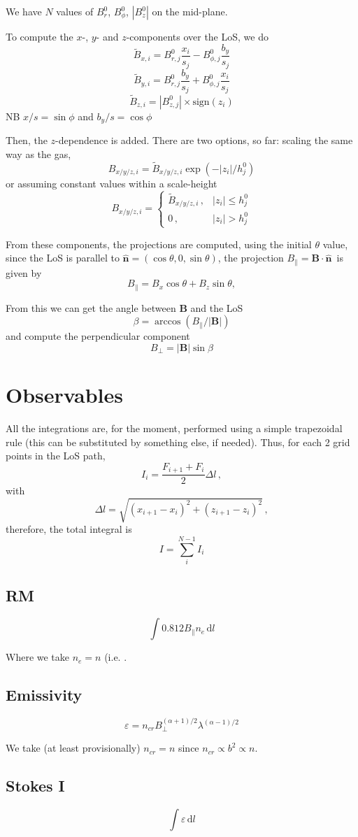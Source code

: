 \documentclass[a4paper,10pt]{article}
\newcommand{\dd}{\mathrm{d}}  %
\renewcommand{\vec}{\bm} %
\begin{document}
We have $N$ values of $B^0_r$, $B^0_\phi$, $|B^0_z|$
on the mid-plane.

To compute the $x$-, $y$- and $z$-components over the LoS, we do
\[
\widetilde B_{x,i} = B^0_{r,j} \frac{x_i}{s_j} - B^0_{\phi,j} \frac{b_y}{s_j}
\]
\[
\widetilde B_{y,i} = B^0_{r,j} \frac{b_y}{s_j} + B^0_{\phi,j} \frac{x_i}{s_j}
\]
\[
\widetilde B_{z,i} = |B^0_{z,j}| \times \text{sign}(z_i)
\]
NB $x/s = \sin\phi$ and $b_y/s = \cos\phi$

Then, the $z$-dependence is added. There are two options, so far: scaling the same way
as the gas,
\[
    B_{x/y/z,i} = \widetilde B_{x/y/z,i} \exp(-|z_i|/h^0_j)
\]
or assuming constant values within a scale-height
\[
    B_{x/y/z,i} = \begin{cases}
                    \widetilde B_{x/y/z,i}\,, & |z_i| \leq h^0_j\\
                                0\,,          & |z_i| >    h^0_j
                  \end{cases}
\]

From these components, the projections are computed, using the initial $\theta$ value,
since the LoS is parallel to $\vec {\hat n} = (\cos\theta, 0, \sin\theta)$, the projection
$B_\parallel = \vec B \cdot \vec{\hat n}\,$ is given by
\[
    B_\parallel = B_x \cos\theta + B_z \sin\theta,
\]

From this we can get the angle between $\vec B$ and the LoS
\[
    \beta = \arccos(B_\parallel/|\vec B|)
\]
and compute the perpendicular component
\[
    B_\perp = |\vec B|\sin\beta
\]

\section{Observables}

All the integrations are, for the moment, performed using a simple trapezoidal rule
(this can be substituted by something else, if needed).
Thus, for each 2 grid points in the LoS path,
\[
 I_i = \frac{F_{i+1}+F_{i}}{2} \Delta l\,,
\]
with
\[
    \Delta l = \sqrt{ (x_{i+1}-x_i)^2 + (z_{i+1}-z_i)^2}\,,
\]
therefore, the total integral is
\[
 I = \sum_{i}^{N-1} I_i
\]




\subsection{RM}
\[
    \int 0.812 B_\parallel n_e \,\dd l
\]

Where we take $n_e=n$ (i.e. .
\subsection{Emissivity}

\[
 \varepsilon = n_{cr} B_\perp^{(\alpha+1)/2}\lambda^{(\alpha-1)/2}
\]

We take (at least provisionally) $n_{cr} = n$ since $n_{cr}\propto b^2 \propto n$.

\subsection{Stokes I}
\[
    \int \varepsilon  \,\dd l
\]
\end{document}
